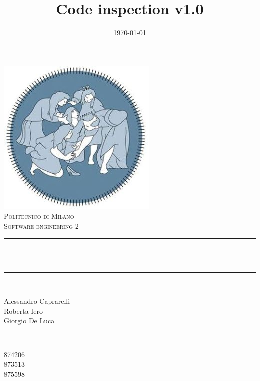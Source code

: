 \documentclass[12pt]{report}
\title{Code inspection v1.0}                             %
\date{\today}                                           %
\makeatletter
\let\thetitle\@title
\let\thedate\@date
\makeatother
\begin{document}

\begin{titlepage}
    \centering
    \vspace*{0.5 cm}
    \includegraphics[scale = 0.75]{images/poli.jpg}\\[1.0 cm]   %
    \textsc{\LARGE Politecnico di Milano}\\[2.0 cm]   %
    \textsc{\large Software engineering 2}\\[0.5 cm]               %
    \rule{\linewidth}{0.2 mm} \\[0.4 cm]
    { \huge \bfseries \thetitle}\\
    \rule{\linewidth}{0.2 mm} \\[1.5 cm]
    
    \begin{minipage}{0.4\textwidth}
        \begin{flushleft} \large
            Alessandro Caprarelli \\
	 Roberta Iero \\
	 Giorgio De Luca
	
            \end{flushleft}
            \end{minipage}~ 
            \begin{minipage}{0.4\textwidth}
            \begin{flushright} \large
            874206  \\
            873513 \\
            875598
        \end{flushright}
    \end{minipage}\\[2 cm]
    
    {\large \thedate}\\[2 cm]
 
    \vfill
    
\end{titlepage}
\end{document}
